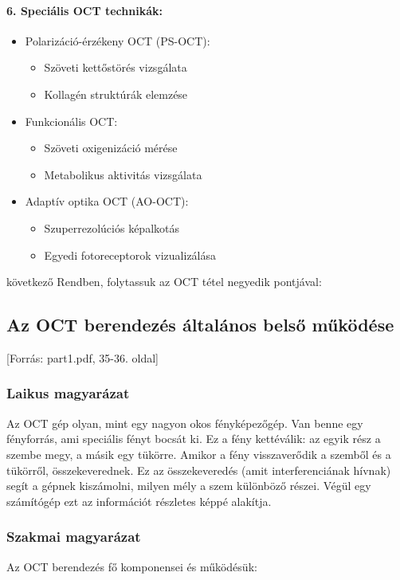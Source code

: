 \documentclass[a4paper,12pt]{article}
\begin{document}
\paragraph{6. Speciális OCT technikák:} \begin{itemize} \item Polarizáció-érzékeny OCT (PS-OCT): \begin{itemize} \item Szöveti kettőstörés vizsgálata \item Kollagén struktúrák elemzése \end{itemize} \item Funkcionális OCT: \begin{itemize} \item Szöveti oxigenizáció mérése \item Metabolikus aktivitás vizsgálata \end{itemize} \item Adaptív optika OCT (AO-OCT): \begin{itemize} \item Szuperrezolúciós képalkotás \item Egyedi fotoreceptorok vizualizálása \end{itemize} \end{itemize}

következő
Rendben, folytassuk az OCT tétel negyedik pontjával:

\subsection{Az OCT berendezés általános belső működése} [Forrás: part1.pdf, 35-36. oldal]

\subsubsection{Laikus magyarázat} Az OCT gép olyan, mint egy nagyon okos fényképezőgép. Van benne egy fényforrás, ami speciális fényt bocsát ki. Ez a fény kettéválik: az egyik rész a szembe megy, a másik egy tükörre. Amikor a fény visszaverődik a szemből és a tükörről, összekeverednek. Ez az összekeveredés (amit interferenciának hívnak) segít a gépnek kiszámolni, milyen mély a szem különböző részei. Végül egy számítógép ezt az információt részletes képpé alakítja.

\subsubsection{Szakmai magyarázat} Az OCT berendezés fő komponensei és működésük:
\end{document}
